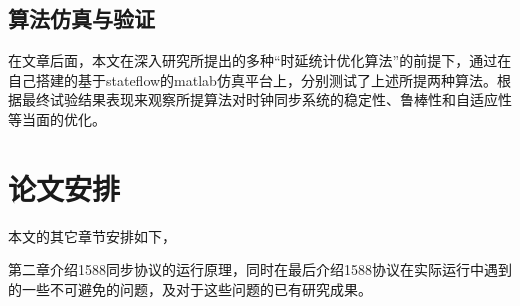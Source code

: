 \subsection{算法仿真与验证}
在文章后面，本文在深入研究所提出的多种“时延统计优化算法”的前提下，通过在自己搭建的基于stateflow的matlab仿真平台上，分别测试了上述所提两种算法。根据最终试验结果表现来观察所提算法对时钟同步系统的稳定性、鲁棒性和自适应性等当面的优化。


\section{论文安排}
本文的其它章节安排如下，

第二章介绍1588同步协议的运行原理，同时在最后介绍1588协议在实际运行中遇到的一些不可避免的问题，及对于这些问题的已有研究成果。

